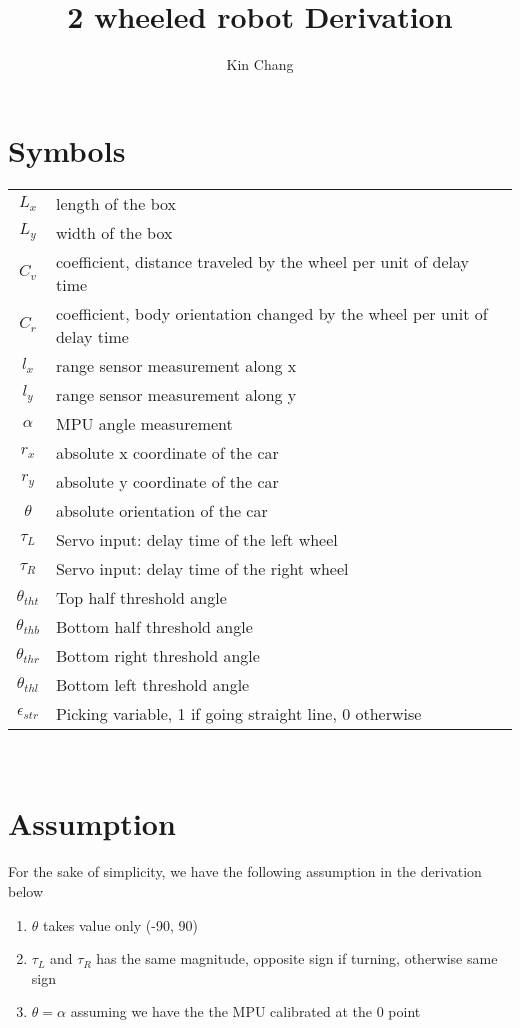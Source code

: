 \documentclass[12pt, letterpaper]{amsart} %
\author{Kin Chang}
\title{2 wheeled robot Derivation}
\numberwithin{equation}{section}
\begin{document}
\maketitle
\section{Symbols}
\begin{tabular}{cp{}}
  $L_x$ & length of the box  \\
  $L_y$ & width of the box \\
  $C_v$ & coefficient, distance traveled by the wheel per unit of delay time \\
  $C_r$ & coefficient, body orientation changed by the wheel per unit of delay time \\
  $l_x$ & range sensor measurement along x \\
  $l_y$ & range sensor measurement along y \\
  $\alpha$ & MPU angle measurement \\
  $r_x$ & absolute x coordinate of the car \\
  $r_y$ & absolute y coordinate of the car \\
  $\theta$ & absolute orientation of the car \\
  $\tau_L$ & Servo input: delay time of the left wheel \\
  $\tau_R$ & Servo input: delay time of the right wheel \\
  $\theta_{tht}$ & Top half threshold angle \\
  $\theta_{thb}$ & Bottom half threshold angle \\
  $\theta_{thr}$ & Bottom right threshold angle \\
  $\theta_{thl}$ & Bottom left threshold angle \\
  $\epsilon_{str}$ & Picking variable, 1 if going straight line, 0 otherwise
\end{tabular}\\
\section{Assumption}
For the sake of simplicity, we have the following assumption in the derivation below
\begin{enumerate}
\item $\theta$ takes value only (-90, 90)
\item $\tau_L$ and $\tau_R$ has the same magnitude, opposite sign if turning, otherwise same sign 
\item $\theta = \alpha$ assuming we have the the MPU calibrated at the 0 point
\end{enumerate}  
\end{document}
